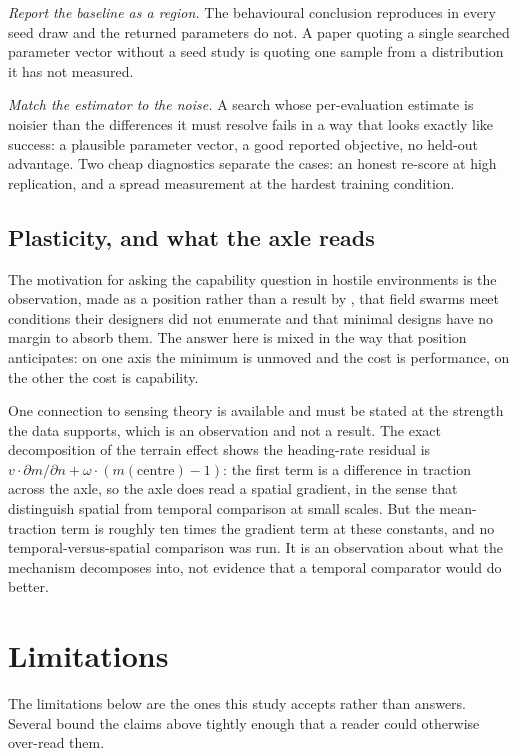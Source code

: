 \documentclass[11pt,a4paper]{article}
\begin{document}
\emph{Report the baseline as a region.} The behavioural conclusion reproduces in
every seed draw and the returned parameters do not. A paper quoting a single
searched parameter vector without a seed study is quoting one sample from a
distribution it has not measured.

\emph{Match the estimator to the noise.} A search whose per-evaluation estimate
is noisier than the differences it must resolve fails in a way that looks exactly
like success: a plausible parameter vector, a good reported objective, no
held-out advantage. Two cheap diagnostics separate the cases: an honest re-score at high
replication, and a spread measurement at the hardest training condition.

\subsection{Plasticity, and what the axle reads}

The motivation for asking the capability question in hostile environments is the
observation, made as a position rather than a result by \citet{hunt2020}, that
field swarms meet conditions their designers did not enumerate and that minimal
designs have no margin to absorb them. The answer here is mixed in the way that
position anticipates: on one axis the minimum is unmoved and the cost is
performance, on the other the cost is capability.

One connection to sensing theory is available and must be stated at the strength
the data supports, which is an observation and not a result. The exact
decomposition of the terrain effect shows the heading-rate residual is
$v \cdot \partial m/\partial n + \omega \cdot (m(\text{centre}) - 1)$: the first
term is a difference in traction across the axle, so the axle does read a
spatial gradient, in the sense that \citet{bergpurcell1977} distinguish spatial
from temporal comparison at small scales. But the mean-traction term is roughly
ten times the gradient term at these constants, and no temporal-versus-spatial
comparison was run. It is an observation about what the mechanism decomposes
into, not evidence that a temporal comparator would do better.

\section{Limitations}
\label{sec:limitations}

The limitations below are the ones this study accepts rather than answers. Several
bound the claims above tightly enough that a reader could otherwise over-read
them.
\end{document}
